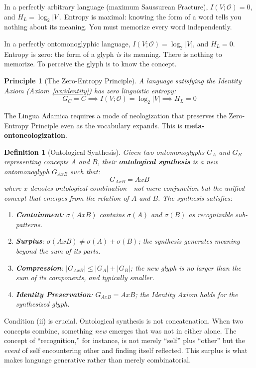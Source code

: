 \documentclass[12pt, letterpaper]{book}
\def\equiv{=}%
\def\otimes{x}%
\newtheorem{definition}{Definition}[chapter]
\newtheorem{principle}{Principle}[chapter]
\begin{document}
In a perfectly arbitrary language (maximum Saussurean Fracture), $I(V; \mathcal{O}) = 0$, and $H_L = \log_2 |V|$. Entropy is maximal: knowing the form of a word tells you nothing about its meaning. You must memorize every word independently.

In a perfectly ontomonoglyphic language, $I(V; \mathcal{O}) = \log_2 |V|$, and $H_L = 0$. Entropy is zero: the form of a glyph \textit{is} its meaning. There is nothing to memorize. To perceive the glyph is to know the concept.

\begin{principle}[The Zero-Entropy Principle]\label{pr:zero-entropy}
A language satisfying the Identity Axiom (Axiom~\ref{ax:identity}) has zero linguistic entropy:
\[
G_C \equiv C \implies I(V; \mathcal{O}) = \log_2 |V| \implies H_L = 0
\]
\end{principle}

The Lingua Adamica requires a mode of neologization that preserves the Zero-Entropy Principle even as the vocabulary expands. This is \textbf{meta-ontoneologization}.

\begin{definition}[Ontological Synthesis]\label{def:synthesis}
Given two ontomonoglyphs $G_A$ and $G_B$ representing concepts $A$ and $B$, their \textbf{ontological synthesis} is a new ontomonoglyph $G_{A \otimes B}$ such that:
\[
G_{A \otimes B} \equiv A \otimes B
\]
where $\otimes$ denotes ontological combination---not mere conjunction but the \textit{unified concept} that emerges from the relation of $A$ and $B$. The synthesis satisfies:
\begin{enumerate}[label=(\roman*)]
    \item \textbf{Containment}: $\sigma(A \otimes B)$ contains $\sigma(A)$ and $\sigma(B)$ as recognizable sub-patterns.
    \item \textbf{Surplus}: $\sigma(A \otimes B) \neq \sigma(A) + \sigma(B)$; the synthesis generates meaning beyond the sum of its parts.
    \item \textbf{Compression}: $|G_{A \otimes B}| \leq |G_A| + |G_B|$; the new glyph is no larger than the sum of its components, and typically smaller.
    \item \textbf{Identity Preservation}: $G_{A \otimes B} \equiv A \otimes B$; the Identity Axiom holds for the synthesized glyph.
\end{enumerate}
\end{definition}

Condition (ii) is crucial. Ontological synthesis is not concatenation. When two concepts combine, something \textit{new} emerges that was not in either alone. The concept of ``recognition,'' for instance, is not merely ``self'' plus ``other'' but the \textit{event} of self encountering other and finding itself reflected. This surplus is what makes language generative rather than merely combinatorial.
\end{document}
